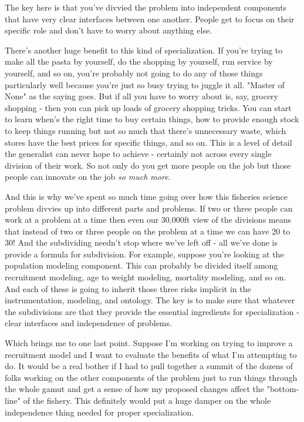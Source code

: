 \documentclass[11pt,a5paper]{book}
\begin{document}
The key here is that you've divvied the problem into independent components that have very clear interfaces between one another. People get to focus on their specific role and don't have to worry about anything else. 
\newline

There's another huge benefit to this kind of specialization. If you're trying to make all the pasta by yourself, do the shopping by yourself, run service by yourself, and so on, you're probably not going to do any of those things particularly well because you're just so busy trying to juggle it all. "Master of None" as the saying goes. But if all you have to worry about is, say, grocery shopping - then you can pick up loads of grocery shopping tricks. You can start to learn when's the right time to buy certain things, how to provide enough stock to keep things running but not so much that there's unnecessary waste, which stores have the best prices for specific things, and so on. This is a level of detail the generalist can never hope to achieve - certainly not across every single division of their work. So not only do you get more people on the job but those people can innovate on the job \textit{so much more}. 
\newline

And this is why we've spent so much time going over how this fisheries science problem divvies up into different parts and problems. If two or three people can work at a problem at a time then even our 30,000ft view of the divisions means that instead of two or three people on the problem at a time we can have 20 to 30! And the subdividing needn't stop where we've left off - all we've done is provide a formula for subdivision. For example, suppose you're looking at the population modeling component. This can probably be divided itself among recruitment modeling, age to weight modeling, mortality modeling, and so on. And each of these is going to inherit those three risks implicit in the instrumentation, modeling, and ontology. The key is to make sure that whatever the subdivisions are that they provide the essential ingredients for specialization - clear interfaces and independence of problems. 
\newline

Which brings me to one last point. Suppose I'm working on trying to improve a recruitment model and I want to evaluate the benefits of what I'm attempting to do. It would be a real bother if I had to pull together a summit of the dozens of folks working on the other components of the problem just to run things through the whole gamut and get a sense of how my proposed changes affect the "bottom-line" of the fishery. This definitely would put a huge damper on the whole independence thing needed for proper specialization.
\newline
\end{document}
